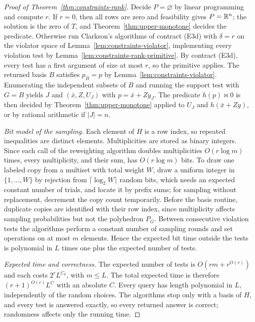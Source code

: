 \begin{proof}[Proof of Theorem~\ref{thm:constraints-rank}]
Decide $P=\varnothing$ by linear programming and compute $r$. If $r=0$, then
all rows are zero and feasibility gives $P=\mathbb R^n$; the solution is the zero of
$T$, and Theorem~\ref{thm:upper-monotone} decides the predicate. Otherwise run
Clarkson's algorithms of contract (E3d) with $\delta=r$ on the violator space
of Lemma~\ref{lem:constraints-violator}, implementing every violation test by
Lemma~\ref{lem:constraints-rank-primitive}. By contract (E3d), every test has a
first argument of size at most $r$, so the primitive applies. The returned
basis $B$ satisfies $p_B=p$ by Lemma~\ref{lem:constraints-violator}.
Enumerating the independent subsets of $B$ and running the support test with
$G=B$ yields $J$ and $(\bar x,Z,U_J)$ with $p=\bar x+Zy_J$. The predicate
$h(p)\bowtie0$ is then decided by Theorem~\ref{thm:upper-monotone} applied to
$U_J$ and $h(\bar x+Zy)$, or by rational arithmetic if $|J|=n$.

\emph{Bit model of the sampling.} Each element of $H$ is a row index, so
repeated inequalities are distinct elements. Multiplicities are stored as
binary integers. Since each call of the reweighting algorithm doubles
multiplicities $O(r\log m)$ times, every multiplicity, and their sum, has
$O(r\log m)$ bits. To draw one labeled copy from a multiset with total weight
$W$, draw a uniform integer in $\{1,\ldots,W\}$ by rejection from
$\lceil\log_2W\rceil$ random bits, which needs an expected constant number of
trials, and locate it by prefix sums; for sampling without replacement,
decrement the copy count temporarily. Before the basis routine, duplicate
copies are identified with their row index, since multiplicity affects
sampling probabilities but not the polyhedron $P_G$. Between consecutive
violation tests the algorithms perform a constant number of sampling rounds and
set operations on at most $m$ elements. Hence the expected bit time outside
the tests is polynomial in $L$ times one plus the expected number of tests.

\emph{Expected time and correctness.} The expected number of tests is
$O(rm+r^{O(r)})$ and each costs $2^rL^{C_0}$, with $m\le L$. The total expected
time is therefore $(r+1)^{O(r)}L^{C}$ with an absolute $C$. Every query has
length polynomial in $L$, independently of the random choices. The algorithms
stop only with a basis of $H$, and every test is answered exactly, so every
returned answer is correct; randomness affects only the running time.
\end{proof}

